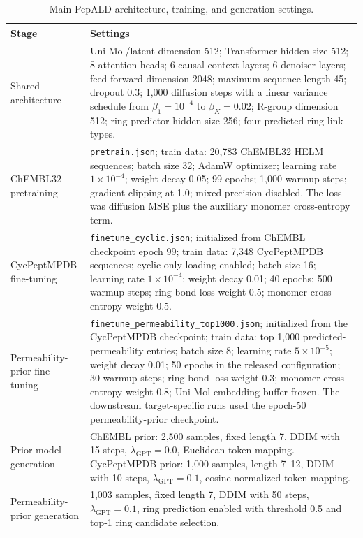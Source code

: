 \documentclass[12pt]{article}
\begin{document}
\begin{table}[htbp]
\centering
\small
\caption{Main PepALD architecture, training, and generation settings.}
\label{tab:sup_training}
\begin{tabular}{L{0.25\textwidth}L{0.66\textwidth}}
\toprule
Stage & Settings \\
\midrule
Shared architecture & Uni-Mol/latent dimension 512; Transformer hidden size 512; 8 attention heads; 6 causal-context layers; 6 denoiser layers; feed-forward dimension 2048; maximum sequence length 45; dropout 0.3; 1,000 diffusion steps with a linear variance schedule from \(\beta_1=10^{-4}\) to \(\beta_K=0.02\); R-group dimension 512; ring-predictor hidden size 256; four predicted ring-link types. \\
ChEMBL32 pretraining & \texttt{pretrain.json}; train data: 20,783 ChEMBL32 HELM sequences; batch size 32; AdamW optimizer; learning rate \(1\times10^{-4}\); weight decay 0.05; 99 epochs; 1,000 warmup steps; gradient clipping at 1.0; mixed precision disabled. The loss was diffusion MSE plus the auxiliary monomer cross-entropy term. \\
CycPeptMPDB fine-tuning & \texttt{finetune\_cyclic.json}; initialized from ChEMBL checkpoint epoch 99; train data: 7,348 CycPeptMPDB sequences; cyclic-only loading enabled; batch size 16; learning rate \(1\times10^{-4}\); weight decay 0.01; 40 epochs; 500 warmup steps; ring-bond loss weight 0.5; monomer cross-entropy weight 0.5. \\
Permeability-prior fine-tuning & \texttt{finetune\_permeability\_top1000.json}; initialized from the CycPeptMPDB checkpoint; train data: top 1,000 predicted-permeability entries; batch size 8; learning rate \(5\times10^{-5}\); weight decay 0.01; 50 epochs in the released configuration; 30 warmup steps; ring-bond loss weight 0.3; monomer cross-entropy weight 0.8; Uni-Mol embedding buffer frozen. The downstream target-specific runs used the epoch-50 permeability-prior checkpoint. \\
Prior-model generation & ChEMBL prior: 2,500 samples, fixed length 7, DDIM with 15 steps, \(\lambda_{\mathrm{GPT}}=0.0\), Euclidean token mapping. CycPeptMPDB prior: 1,000 samples, length 7--12, DDIM with 10 steps, \(\lambda_{\mathrm{GPT}}=0.1\), cosine-normalized token mapping. \\
Permeability-prior generation & 1,003 samples, fixed length 7, DDIM with 50 steps, \(\lambda_{\mathrm{GPT}}=0.1\), ring prediction enabled with threshold 0.5 and top-1 ring candidate selection. \\
\bottomrule
\end{tabular}
\end{table}
\FloatBarrier
\end{document}
